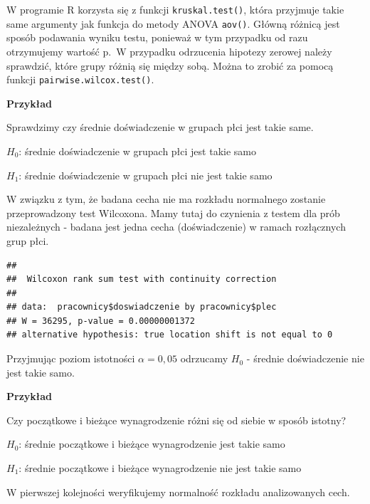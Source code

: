\documentclass[
]{book}
\newenvironment{Shaded}{\begin{snugshade}}{\end{snugshade}}
\newcommand{\KeywordTok}[1]{\textcolor[rgb]{0.13,0.29,0.53}{\textbf{#1}}}
\newcommand{\NormalTok}[1]{#1}
\newcommand{\OperatorTok}[1]{\textcolor[rgb]{0.81,0.36,0.00}{\textbf{#1}}}
\newcommand{\StringTok}[1]{\textcolor[rgb]{0.31,0.60,0.02}{#1}}
\begin{document}
W programie R korzysta się z funkcji \texttt{kruskal.test()}, która przyjmuje takie same argumenty jak funkcja do metody ANOVA \texttt{aov()}. Główną różnicą jest sposób podawania wyniku testu, ponieważ w tym przypadku od razu otrzymujemy wartość p.~W przypadku odrzucenia hipotezy zerowej należy sprawdzić, które grupy różnią się między sobą. Można to zrobić za pomocą funkcji \texttt{pairwise.wilcox.test()}.

\textbf{Przykład}

Sprawdzimy czy średnie doświadczenie w grupach płci jest takie same.

\(H_0\): średnie doświadczenie w grupach płci jest takie samo

\(H_1\): średnie doświadczenie w grupach płci nie jest takie samo

W związku z tym, że badana cecha nie ma rozkładu normalnego zostanie przeprowadzony test Wilcoxona. Mamy tutaj do czynienia z testem dla prób niezależnych - badana jest jedna cecha (doświadczenie) w ramach rozłącznych grup płci.

\begin{Shaded}
\end{Shaded}

\begin{verbatim}
## 
##  Wilcoxon rank sum test with continuity correction
## 
## data:  pracownicy$doswiadczenie by pracownicy$plec
## W = 36295, p-value = 0.00000001372
## alternative hypothesis: true location shift is not equal to 0
\end{verbatim}

Przyjmując poziom istotności \(\alpha = 0,05\) odrzucamy \(H_0\) - średnie doświadczenie nie jest takie samo.

\textbf{Przykład}

Czy początkowe i bieżące wynagrodzenie różni się od siebie w sposób istotny?

\(H_0\): średnie początkowe i bieżące wynagrodzenie jest takie samo

\(H_1\): średnie początkowe i bieżące wynagrodzenie nie jest takie samo

W pierwszej kolejności weryfikujemy normalność rozkładu analizowanych cech.

\begin{Shaded}
\end{Shaded}
\end{document}
